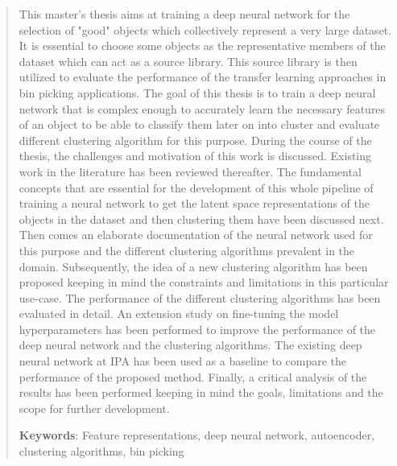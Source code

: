 \begin{abstract}

This master's thesis aims at training a deep neural network for the selection of "good" objects which collectively represent a very large dataset. It is essential to choose some objects as the representative members of the dataset which can act as a source library. This source library is then utilized to evaluate the performance of the transfer learning approaches in bin picking applications. The goal of this thesis is to train a deep neural network that is complex enough to accurately learn the necessary features of an object to be able to classify them later on into cluster and evaluate different clustering algorithm for this purpose. During the course of the thesis, the challenges and motivation of this work is discussed. Existing work in the literature has been reviewed thereafter. The fundamental concepts that are essential for the development of this whole pipeline of training a neural network to get the latent space representations of the objects in the dataset and then clustering them have been discussed next. Then comes an elaborate documentation of the neural network used for this purpose and the different clustering algorithms prevalent in the domain. Subsequently, the idea of a new clustering algorithm has been proposed keeping in mind the constraints and limitations in this particular use-case. The performance of the different clustering algorithms has been evaluated in detail. An extension study on fine-tuning the model hyperparameters has been performed to improve the performance of the deep neural network and the clustering algorithms. The existing deep neural network at \ac{IPA} has been used as a baseline to compare the performance of the proposed method. Finally, a critical analysis of the results has been performed keeping in mind the goals, limitations and the scope for further development. 

\vspace{20mm}

\textbf{Keywords}: Feature representations, deep neural network, autoencoder, clustering algorithms, bin picking
\end{abstract}